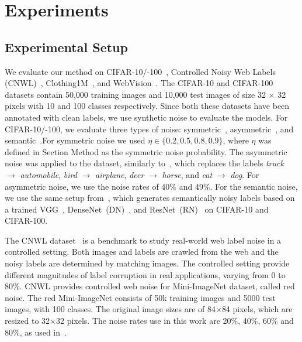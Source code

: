 \documentclass[review]{elsarticle}
\theoremstyle{plain}
\begin{document}
\section{Experiments} 
\label{sec:experiments}






\subsection{Experimental Setup}
\label{sec:experimental_setup}


We evaluate our method on CIFAR-10/-100~\citep{krizhevsky2009learning},  Controlled Noisy Web Labels (CNWL)~\citep{jiang2020beyond}, Clothing1M~\citep{xiao2015learning}, and  WebVision~\citep{li2017webvision}.
The CIFAR-10 and CIFAR-100 datasets contain 50,000 training images and 10,000 test images of size 32 $\times$ 32 pixels with 10 and 100 classes respectively. Since both these datasets have been annotated with clean labels, we use synthetic noise to evaluate the models. 
For CIFAR-10/-100, we evaluate three types of noise: symmetric~\citep{tanaka2018joint,li2019learning}, asymmetric~\citep{tanaka2018joint,li2019learning}, and semantic~\citep{rog}.For symmetric noise we used $\eta \in \{0.2, 0.5, 0.8, 0.9\}$, where $\eta$ was defined in Section Method as the symmetric noise probability. 
The asymmetric noise was applied to the dataset, similarly to~\citep{li2020dividemix}, which replaces the labels \emph{truck} $\rightarrow$ \emph{automobile}, \emph{bird} $\rightarrow$ \emph{airplane}, \emph{deer} $\rightarrow$ \emph{horse}, and \emph{cat} $\rightarrow$ \emph{dog}. For asymmetric noise, we use the noise rates of 40\% and 49\%. For the semantic noise, we use the same setup from~\citep{rog}, which generates semantically noisy labels based on a trained VGG~\citep{vgg}, DenseNet~(DN)~\citep{huang2017densely}, and ResNet~(RN)~\citep{ResNet18} on CIFAR-10 and CIFAR-100.


The CNWL dataset~\citep{jiang2020beyond} is a benchmark to study real-world web label noise in a controlled setting. Both images and labels are crawled from the web and the noisy labels are determined by matching images. The controlled setting provide different magnitudes of label corruption in real applications, varying from 0 to 80\%. CNWL provides controlled web noise for Mini-ImageNet dataset, called red noise. The red Mini-ImageNet consists of 50k training images and 5000 test images, with 100 classes. The original image sizes are of 84$\times$84 pixels, which are resized to 32$\times$32 pixels. The noise rates use in this work are 20\%, 40\%, 60\% and 80\%, as used in~\citep{FaMUS}.   
\end{document}

